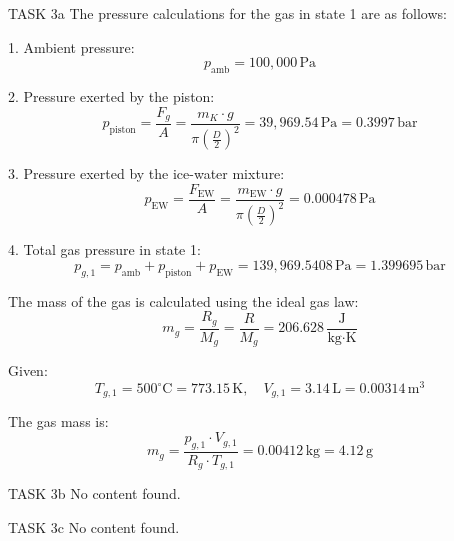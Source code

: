 TASK 3a  
The pressure calculations for the gas in state 1 are as follows:  

1. Ambient pressure:  
\[
p_{\text{amb}} = 100,000 \, \text{Pa}
\]

2. Pressure exerted by the piston:  
\[
p_{\text{piston}} = \frac{F_g}{A} = \frac{m_K \cdot g}{\pi \left(\frac{D}{2}\right)^2} = 39,969.54 \, \text{Pa} = 0.3997 \, \text{bar}
\]

3. Pressure exerted by the ice-water mixture:  
\[
p_{\text{EW}} = \frac{F_{\text{EW}}}{A} = \frac{m_{\text{EW}} \cdot g}{\pi \left(\frac{D}{2}\right)^2} = 0.000478 \, \text{Pa}
\]

4. Total gas pressure in state 1:  
\[
p_{g,1} = p_{\text{amb}} + p_{\text{piston}} + p_{\text{EW}} = 139,969.5408 \, \text{Pa} = 1.399695 \, \text{bar}
\]

The mass of the gas is calculated using the ideal gas law:  
\[
m_g = \frac{R_g}{M_g} = \frac{R}{M_g} = 206.628 \, \frac{\text{J}}{\text{kg·K}}
\]

Given:  
\[
T_{g,1} = 500^\circ\text{C} = 773.15 \, \text{K}, \quad V_{g,1} = 3.14 \, \text{L} = 0.00314 \, \text{m}^3
\]

The gas mass is:  
\[
m_g = \frac{p_{g,1} \cdot V_{g,1}}{R_g \cdot T_{g,1}} = 0.00412 \, \text{kg} = 4.12 \, \text{g}
\]

TASK 3b  
No content found.

TASK 3c  
No content found.